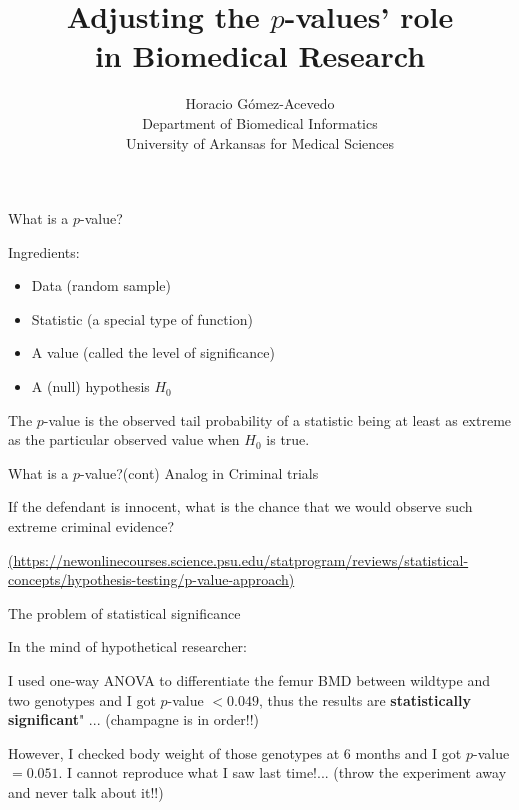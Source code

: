 \documentclass{beamer}
\title{Adjusting the $p$-values' role \\  in Biomedical Research}
\author{Horacio G\'omez-Acevedo\\ Department of Biomedical Informatics\\
University of Arkansas for Medical Sciences}
\begin{document}
	\begin{frame}[plain]
		\maketitle
	\end{frame}
	\begin{frame}{What is a $p$-value?}
		
		Ingredients:
\begin{itemize}
	\item Data (random sample)
	\item Statistic (a special type of function)
	\item A value (called the level of significance)
	\item A (null) hypothesis $H_0$	
\end{itemize}		

\begin{definition}
	The $p$-value is the observed tail probability of a statistic being at least as extreme as the particular observed value when $H_0$ is true.
\end{definition}		
		
		
	

		
	\end{frame}

\begin{frame}{What is a $p$-value?(cont)}
	Analog in Criminal trials
	
	If the defendant is innocent, what is the chance that we would observe such extreme criminal evidence?

	
\href{}{(https://newonlinecourses.science.psu.edu/statprogram/reviews/statistical-concepts/hypothesis-testing/p-value-approach)}

\end{frame}
	



\begin{frame}{The problem of statistical significance}
	
In the mind of hypothetical researcher:

\begin{displayquote}
	I used one-way ANOVA to differentiate the femur BMD between wildtype and two genotypes and I got $p$-value $<0.049$, thus the results are \textbf{statistically significant}"  ... (champagne is in order!!) 
\end{displayquote}

\begin{displayquote}
However, I checked body weight of those genotypes at 6 months and I got $p$-value $= 0.051$. I cannot reproduce what I saw last time!... (throw the experiment away and never talk about it!!)
\end{displayquote}

\end{frame}
\end{document}
